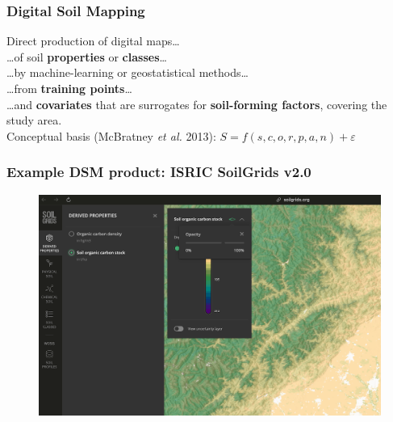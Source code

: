 \documentclass[aspectratio=169, 10pt]{beamer}
\begin{document}
\begin{frame}
\frametitle{Digital Soil Mapping}

Direct production of digital maps\ldots\\
\ldots of soil \textbf{properties} or \textbf{classes}\ldots\\
\ldots by machine-learning or geostatistical methods\ldots\\
\ldots from \textbf{training points}\ldots\\
\ldots and \textbf{covariates} that are surrogates for \textbf{soil-forming factors}, covering the study area.
\\[2ex]
Conceptual basis (McBratney \textit{et al.} 2013): $S = f(s, c, o, r, p, a, n) + \varepsilon$ 
\end{frame}



\begin{frame}
  \frametitle{Example DSM product: ISRIC SoilGrids v2.0}
\begin{figure}
    \centering
\includegraphics[height=0.75\textheight]{./graphics_david/SoilGrids_SOCstock_Chengdu.png}
\end{figure}
\end{frame}
\end{document}
